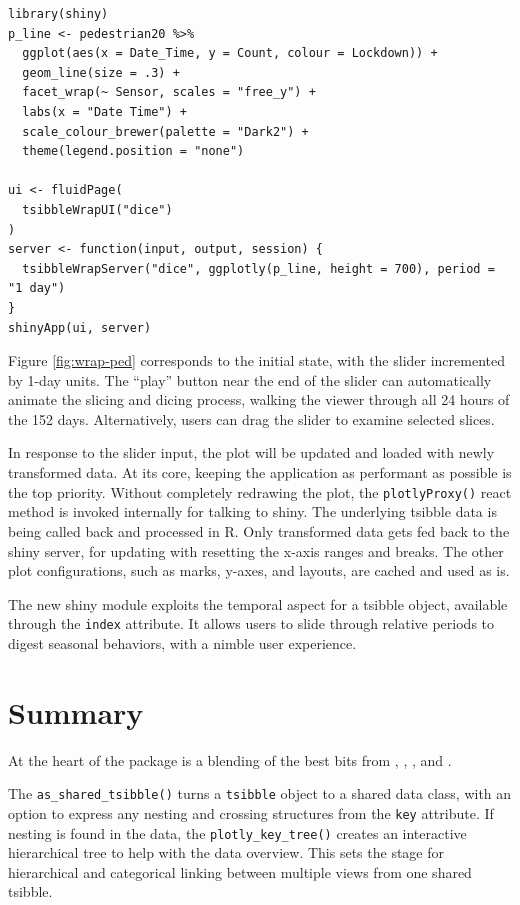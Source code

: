 \begin{verbatim}
library(shiny)
p_line <- pedestrian20 %>%
  ggplot(aes(x = Date_Time, y = Count, colour = Lockdown)) +
  geom_line(size = .3) +
  facet_wrap(~ Sensor, scales = "free_y") +
  labs(x = "Date Time") +
  scale_colour_brewer(palette = "Dark2") +
  theme(legend.position = "none")

ui <- fluidPage(
  tsibbleWrapUI("dice")
)
server <- function(input, output, session) {
  tsibbleWrapServer("dice", ggplotly(p_line, height = 700), period = "1 day")
}
shinyApp(ui, server)
\end{verbatim}

Figure \ref{fig:wrap-ped} corresponds to the initial state, with the slider incremented by 1-day units. The ``play'' button near the end of the slider can automatically animate the slicing and dicing process, walking the viewer through all 24 hours of the 152 days. Alternatively, users can drag the slider to examine selected slices.

In response to the slider input, the plot will be updated and loaded with newly transformed data. At its core, keeping the application as performant as possible is the top priority. Without completely redrawing the plot, the \texttt{plotlyProxy()} react method is invoked internally for talking to shiny. The underlying tsibble data is being called back and processed in R. Only transformed data gets fed back to the shiny server, for updating with resetting the x-axis ranges and breaks. The other plot configurations, such as marks, y-axes, and layouts, are cached and used as is.

The new shiny module exploits the temporal aspect for a tsibble object, available through the \texttt{index} attribute. It allows users to slide through relative periods to digest seasonal behaviors, with a nimble user experience.

\hypertarget{summary}{%
\section{Summary}\label{summary}}

At the heart of the  package is a blending of the best bits from , , , and .

The \texttt{as\_shared\_tsibble()} turns a \texttt{tsibble} object to a shared data class, with an option to express any nesting and crossing structures from the \texttt{key} attribute. If nesting is found in the data, the \texttt{plotly\_key\_tree()} creates an interactive hierarchical tree to help with the data overview. This sets the stage for hierarchical and categorical linking between multiple views from one shared tsibble.

